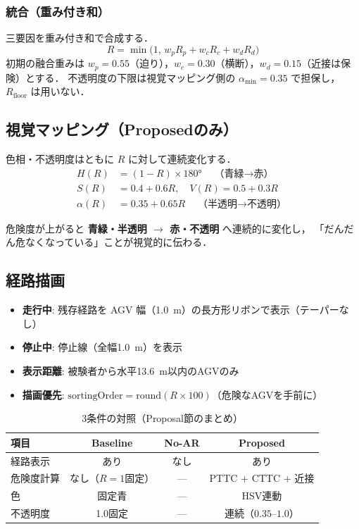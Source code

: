 \subsubsection{統合（重み付き和）}
三要因を重み付き和で合成する．
\begin{equation}
  R=\min\!\bigl(1,\, w_p R_p + w_c R_c + w_d R_d\bigr)
\end{equation}
初期の融合重みは $w_p=0.55$（迫り），$w_c=0.30$（横断），$w_d=0.15$（近接は保険）とする．
不透明度の下限は視覚マッピング側の $\alpha_{\min}=0.35$ で担保し，$R_\text{floor}$ は用いない．

\subsection{視覚マッピング（Proposedのみ）}

色相・不透明度はともに $R$ に対して連続変化する．
\begin{align}
  H(R) &= (1-R) \times 180° \quad \text{（青緑$\rightarrow$赤）} \\
  S(R) &= 0.4 + 0.6R, \quad V(R) = 0.5 + 0.3R \\
  \alpha(R) &= 0.35 + 0.65R \quad \text{（半透明$\rightarrow$不透明）}
\end{align}

危険度が上がると \textbf{青緑・半透明 $\rightarrow$ 赤・不透明} へ連続的に変化し，
「だんだん危なくなっている」ことが視覚的に伝わる．

\subsection{経路描画}

\begin{itemize}[leftmargin=2em]
  \item \textbf{走行中}: 残存経路を AGV 幅（\SI{1.0}{m}）の長方形リボンで表示（テーパーなし）
  \item \textbf{停止中}: 停止線（全幅\SI{1.0}{m}）を表示
  \item \textbf{表示距離}: 被験者から水平\SI{13.6}{m}以内のAGVのみ
  \item \textbf{描画優先}: $\mathrm{sortingOrder}=\mathrm{round}(R\times100)$（危険なAGVを手前に）
\end{itemize}

\begin{table}[htbp]
  \centering
  \caption{3条件の対照（Proposal節のまとめ）}
  \label{tab:conditions}
  \begin{tabular}{lccc}
    \toprule
    項目 & Baseline & No-AR & Proposed \\
    \midrule
    経路表示 & あり & なし & あり \\
    危険度計算 & なし（$R=1$固定） & --- & PTTC + CTTC + 近接 \\
    色 & 固定青 & --- & HSV連動 \\
    不透明度 & 1.0固定 & --- & 連続（$0.35$–$1.0$） \\
    \bottomrule
  \end{tabular}
\end{table}

